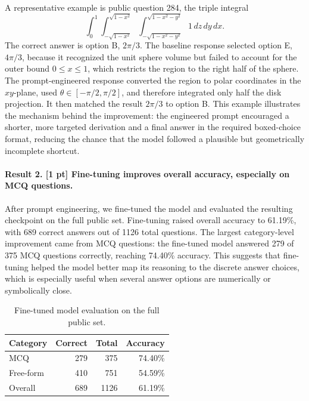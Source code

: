 \documentclass{article}
\begin{document}
A representative example is public question 284, the triple integral
\[
\int_{0}^{1}\int_{-\sqrt{1-x^2}}^{\sqrt{1-x^2}}\int_{-\sqrt{1-x^2-y^2}}^{\sqrt{1-x^2-y^2}}1\,dz\,dy\,dx.
\]
The correct answer is option B, $2\pi/3$.  The baseline response selected option E, $4\pi/3$, because it recognized the unit sphere volume but failed to account for the outer bound $0 \leq x \leq 1$, which restricts the region to the right half of the sphere.  The prompt-engineered response converted the region to polar coordinates in the $xy$-plane, used $\theta \in [-\pi/2,\pi/2]$, and therefore integrated only half the disk projection.  It then matched the result $2\pi/3$ to option B.  This example illustrates the mechanism behind the improvement: the engineered prompt encouraged a shorter, more targeted derivation and a final answer in the required boxed-choice format, reducing the chance that the model followed a plausible but geometrically incomplete shortcut.

\paragraph{Result 2. [1 pt] Fine-tuning improves overall accuracy, especially on MCQ questions.}
After prompt engineering, we fine-tuned the model and evaluated the resulting checkpoint on the full public set.  Fine-tuning raised overall accuracy to 61.19\%, with 689 correct answers out of 1126 total questions.  The largest category-level improvement came from MCQ questions: the fine-tuned model answered 279 of 375 MCQ questions correctly, reaching 74.40\% accuracy.  This suggests that fine-tuning helped the model better map its reasoning to the discrete answer choices, which is especially useful when several answer options are numerically or symbolically close.

\begin{table}[h]
  \caption{Fine-tuned model evaluation on the full public set.}
  \label{tab:finetuned_public_results}
  \centering
  \begin{tabular}{lrrr}
    \toprule
    Category & Correct & Total & Accuracy \\
    \midrule
    MCQ & 279 & 375 & 74.40\% \\
    Free-form & 410 & 751 & 54.59\% \\
    Overall & 689 & 1126 & 61.19\% \\
    \bottomrule
  \end{tabular}
\end{table}
\end{document}

